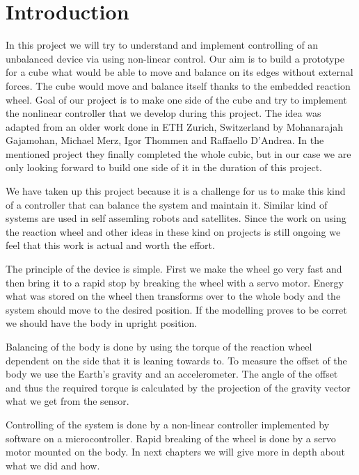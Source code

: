 \section{Introduction}
In this project we will try to understand and implement controlling of an unbalanced device via using non-linear control.
Our aim is to build a prototype for a cube what would be able to move and balance on its edges without external forces.
The cube would move and balance itself thanks to the embedded reaction wheel.
Goal of our project is to make one side of the cube and try to implement the nonlinear controller that we develop during this project.
The idea was adapted from an older work done in ETH Zurich, Switzerland by Mohanarajah Gajamohan, Michael Merz, Igor Thommen and Raffaello D’Andrea.\cite{cubli12}
In the mentioned project they finally completed the whole cubic, but in our case we are only looking forward to build one side of it in the duration of this project.

We have taken up this project because it is a challenge for us to make this kind of a controller that can balance the system and maintain it.
Similar kind of systems are used in self assemling robots and satellites.\cite{selfrobot}\cite{satellite}
Since the work on using the reaction wheel and other ideas in these kind on projects is still ongoing we feel that this work is actual and worth the effort.

The principle of the device is simple. 
First we make the wheel go very fast and then bring it to a rapid stop by breaking the wheel with a servo motor. 
Energy what was stored on the wheel then transforms over to the whole body and the system should move to the desired position.
If the modelling proves to be corret we should have the body in upright position.

Balancing of the body is done by using the torque of the reaction wheel dependent on the side that it is leaning towards to.
To measure the offset of the body we use the Earth's gravity and an accelerometer.
The angle of the offset and thus the required torque is calculated by the projection of the gravity vector what we get from the sensor.

Controlling of the system is done by a non-linear controller implemented by software on a microcontroller.
Rapid breaking of the wheel is done by a servo motor mounted on the body.
In next chapters we will give more in depth about what we did and how.
